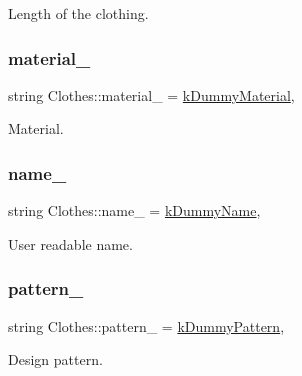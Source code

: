 Length of the clothing. 

\mbox{\label{classClothes_adbb9ed311f14ccbb1e4fe0e8378a95d4}} 
\subsubsection{\texorpdfstring{material\+\_\+}{material\_}}
{\footnotesize\ttfamily string Clothes\+::material\+\_\+ = \mbox{\hyperlink{clothes_8h_a9df1268c6668ae4e2a728ccf032cc33d}{k\+Dummy\+Material}}\hspace{0.3cm}{\ttfamily [protected]}, {\ttfamily [inherited]}}



Material. 

\mbox{\label{classClothes_a7f2275aaae24224d60c48af922c31b65}} 
\subsubsection{\texorpdfstring{name\+\_\+}{name\_}}
{\footnotesize\ttfamily string Clothes\+::name\+\_\+ = \mbox{\hyperlink{clothes_8h_adba739b5125fd5a4066ec0ef063c0657}{k\+Dummy\+Name}}\hspace{0.3cm}{\ttfamily [protected]}, {\ttfamily [inherited]}}



User readable name. 

\mbox{\label{classClothes_a1d40145a4eb6d28441f112f030ab5d35}} 
\subsubsection{\texorpdfstring{pattern\+\_\+}{pattern\_}}
{\footnotesize\ttfamily string Clothes\+::pattern\+\_\+ = \mbox{\hyperlink{clothes_8h_a2e72ae4d77adb7bc9cbecf4dea1e9e22}{k\+Dummy\+Pattern}}\hspace{0.3cm}{\ttfamily [protected]}, {\ttfamily [inherited]}}



Design pattern. 

\mbox{\label{classClothes_a7cb005bf6cbb7f4eaa40f1b31817559c}} 
